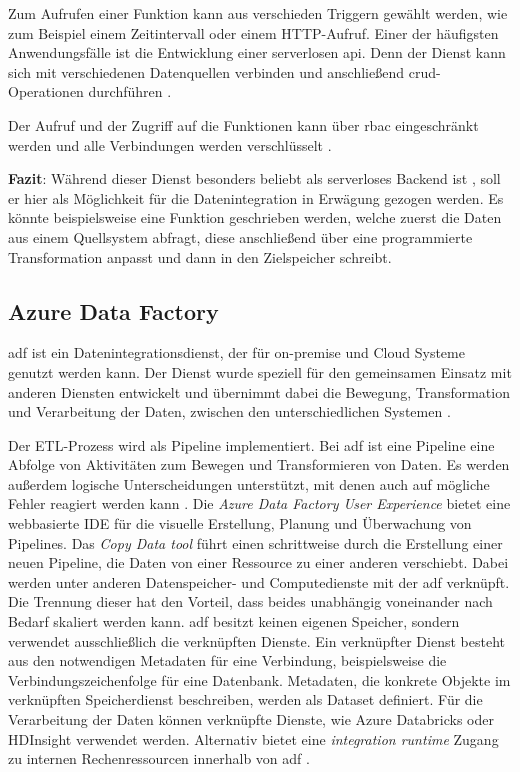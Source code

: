 Zum Aufrufen einer Funktion kann aus verschieden Triggern gewählt werden, wie zum Beispiel einem Zeitintervall oder einem HTTP-Aufruf. Einer der häufigsten Anwendungsfälle ist die Entwicklung einer serverlosen \ac{api}. Denn der Dienst kann sich mit verschiedenen Datenquellen verbinden und anschließend \ac{crud}-Operationen durchführen  \cite{satapathi_hands-azure_2021}. 

Der Aufruf und der Zugriff auf die Funktionen kann über \ac{rbac} eingeschränkt werden \cite{satapathi_hands-azure_2021} und alle Verbindungen werden verschlüsselt \cite{msdoc_21_securingAzureFunctions}.

\textbf{Fazit}: Während dieser Dienst besonders beliebt als serverloses Backend ist \cite[vgl.][]{satapathi_hands-azure_2021}, soll er hier als Möglichkeit für die Datenintegration in Erwägung gezogen werden. Es könnte beispielsweise eine Funktion geschrieben werden, welche zuerst die Daten aus einem Quellsystem abfragt, diese anschließend über eine programmierte Transformation anpasst und dann in den Zielspeicher schreibt.


\subsection{Azure Data Factory} \label{sec:grundlagen:azure_dienste:dataFactory}
\ac{adf} ist ein Datenintegrationsdienst, der für on-premise und Cloud Systeme genutzt werden kann. Der Dienst wurde speziell für den gemeinsamen Einsatz mit anderen Diensten entwickelt und übernimmt dabei die Bewegung, Transformation und Verarbeitung der Daten, zwischen den unterschiedlichen Systemen \cite{klein_iot_2017}.

Der ETL-Prozess wird als Pipeline implementiert. Bei \ac{adf} ist eine Pipeline eine Abfolge von Aktivitäten zum Bewegen und Transformieren von Daten. Es werden außerdem logische Unterscheidungen unterstützt, mit denen auch auf mögliche Fehler reagiert werden kann \cite{msdoc_21_adf_errorMessage}. Die \textit{Azure Data Factory User Experience} bietet eine webbasierte IDE für die visuelle Erstellung, Planung und Überwachung von Pipelines. Das \textit{Copy Data tool} führt einen schrittweise durch die Erstellung einer neuen Pipeline, die Daten von einer Ressource zu einer anderen verschiebt. Dabei werden unter anderen Datenspeicher- und Computedienste mit der \ac{adf} verknüpft. Die Trennung dieser hat den Vorteil, dass beides unabhängig voneinander nach Bedarf skaliert werden kann. \ac{adf} besitzt keinen eigenen Speicher, sondern verwendet ausschließlich die verknüpften Dienste. Ein verknüpfter Dienst besteht aus den notwendigen Metadaten für eine Verbindung, beispielsweise die Verbindungszeichenfolge für eine Datenbank. Metadaten, die konkrete Objekte im verknüpften Speicherdienst beschreiben, werden als Dataset definiert. Für die Verarbeitung der Daten können verknüpfte Dienste, wie Azure Databricks oder HDInsight verwendet werden. Alternativ bietet eine \textit{integration runtime} Zugang zu internen Rechenressourcen innerhalb von \ac{adf} \cite{swinbank_your_2021}.

